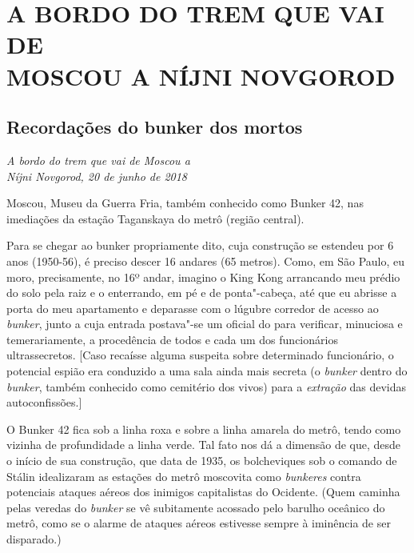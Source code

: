 \clearpage{\pagestyle{empty}\cleardoublepage}
\movetooddpage
{}
\part*{A BORDO DO TREM QUE VAI DE\\MOSCOU A NÍJNI NOVGOROD}

\chapter*{Recordações do bunker dos mortos}

\begin{flushright}
\emph{A bordo do trem que vai de Moscou a\\Níjni Novgorod, 20 de junho de 2018}
\end{flushright}


Moscou, Museu da Guerra Fria, também conhecido como Bunker 42, nas
imediações da estação Taganskaya do metrô (região central).

Para se chegar ao bunker propriamente dito, cuja construção se estendeu
por 6 anos (1950-56), é preciso descer 16 andares (65 metros). Como, em
São Paulo, eu moro, precisamente, no 16º andar, imagino o King Kong
arrancando meu prédio do solo pela raiz e o enterrando, em pé e de
ponta"-cabeça, até que eu abrisse a porta do meu apartamento e deparasse
com o lúgubre corredor de acesso ao \emph{bunker}, junto a cuja entrada
postava"-se um oficial do  para verificar, minuciosa e temerariamente,
a procedência de todos e cada um dos funcionários ultrassecretos.
{[}Caso recaísse alguma suspeita sobre determinado funcionário, o
potencial espião era conduzido a uma sala ainda mais secreta (o
\emph{bunker} dentro do \emph{bunker}, também conhecido como cemitério
dos vivos) para a \emph{extração} das devidas autoconfissões.{]}

O Bunker 42 fica sob a linha roxa e sobre a linha amarela do metrô,
tendo como vizinha de profundidade a linha verde. Tal fato nos dá a
dimensão de que, desde o início de sua construção, que data de 1935, os
bolcheviques sob o comando de Stálin idealizaram as estações do metrô
moscovita como \emph{bunkeres} contra potenciais ataques aéreos dos
inimigos capitalistas do Ocidente. (Quem caminha pelas veredas do
\emph{bunker} se vê subitamente acossado pelo barulho oceânico do metrô,
como se o alarme de ataques aéreos estivesse sempre à iminência de ser
disparado.)

